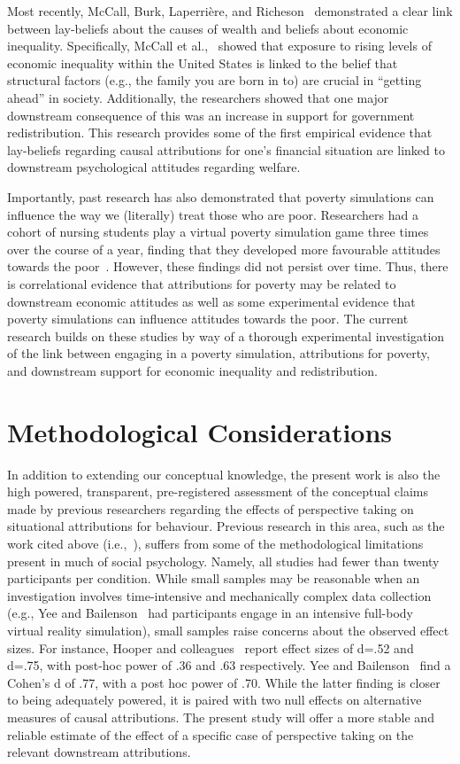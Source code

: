 \documentclass{sfuthesis}
\begin{document}
Most recently, McCall, Burk, Laperrière, and Richeson~\cite{mccall17} demonstrated a clear link between lay-beliefs about the causes of wealth and beliefs about economic inequality. Specifically, McCall et al.,~\cite{mccall17} showed that exposure to rising levels of economic inequality within the United States is linked to the belief that structural factors (e.g., the family you are born in to) are crucial in “getting ahead” in society. Additionally, the researchers showed that one major downstream consequence of this was an increase in support for government redistribution. This research provides some of the first empirical evidence that lay-beliefs regarding causal attributions for one’s financial situation are linked to downstream psychological attitudes regarding welfare. 

Importantly, past research has also demonstrated that poverty simulations can influence the way we (literally) treat those who are poor. Researchers had a cohort of nursing students play a virtual poverty simulation game three times over the course of a year, finding that they developed more favourable attitudes towards the poor~\cite{menzel14}. However, these findings did not persist over time. Thus, there is correlational evidence that attributions for poverty may be related to downstream economic attitudes as well as some experimental evidence that poverty simulations can influence attitudes towards the poor. The current research builds on these studies by way of a thorough experimental investigation of the link between engaging in a poverty simulation, attributions for poverty, and downstream support for economic inequality and redistribution.

\section{Methodological Considerations}

In addition to extending our conceptual knowledge, the present work is also the high powered, transparent, pre-registered assessment of the conceptual claims made by previous researchers regarding the effects of perspective taking on situational attributions for behaviour. Previous research in this area, such as the work cited above (i.e.,~\cite{hooper15, storms73, yee06}), suffers from some of the methodological limitations present in much of social psychology. Namely, all studies had fewer than twenty participants per condition. While small samples may be reasonable when an investigation involves time-intensive and mechanically complex data collection (e.g., Yee and Bailenson~\cite{yee06} had participants engage in an intensive full-body virtual reality simulation), small samples raise concerns about the observed effect sizes. For instance, Hooper and colleagues~\cite{hooper15} report effect sizes of d=.52 and d=.75, with post-hoc power of .36 and .63 respectively. Yee and Bailenson~\cite{yee06} find a Cohen’s d of .77, with a post hoc power of .70. While the latter finding is closer to being adequately powered, it is paired with two null effects on alternative measures of causal attributions. The present study will offer a more stable and reliable estimate of the effect of a specific case of perspective taking on the relevant downstream attributions.
\end{document}
